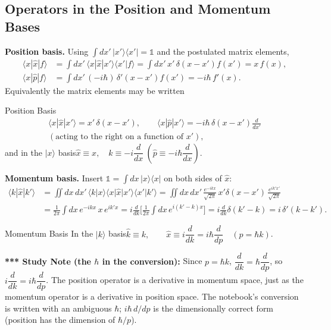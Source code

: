 \documentclass[11pt,a4paper]{article}
\begin{document}
\subsection{Operators in the Position and Momentum Bases}
\textbf{Position basis.} Using $\int dx'\,|x'\rangle\langle x'|=\mathbb 1$ and the postulated matrix elements,
\begin{align*}
\langle x|\hat x|f\rangle&=\int dx'\,\langle x|\hat x|x'\rangle\langle x'|f\rangle=\int dx'\,x'\,\delta(x-x')f(x')=x\,f(x),\\
\langle x|\hat p|f\rangle&=\int dx'\,(-i\hbar)\,\delta'(x-x')f(x')=-i\hbar\,f'(x).
\end{align*}
Equivalently the matrix elements may be written
\begin{thm}{Position Basis}
\begin{gather*}
\langle x|\hat x|x'\rangle=x'\,\delta(x-x'),\qquad
\langle x|\hat p|x'\rangle=-i\hbar\,\delta(x-x')\frac d{dx'}\\
(\text{acting to the right on a function of }x'),
\end{gather*}
and in the $|x\rangle$ basis\quad $\hat x\equiv x,\quad \hat k\equiv-i\dfrac d{dx}\ (\hat p\equiv-i\hbar\dfrac d{dx})$.
\end{thm}

\textbf{Momentum basis.} Insert $\mathbb 1=\int dx\,|x\rangle\langle x|$ on both sides of $\hat x$:
\begin{align*}
\langle k|\hat x|k'\rangle&=\iint dx\,dx'\,\langle k|x\rangle\langle x|\hat x|x'\rangle\langle x'|k'\rangle
=\iint dx\,dx'\,\frac{e^{-ikx}}{\sqrt{2\pi}}\,x'\delta(x-x')\,\frac{e^{ik'x'}}{\sqrt{2\pi}}\\
&=\frac1{2\pi}\int dx\,e^{-ikx}\,x\,e^{ik'x}
=i\frac d{dk}\Big[\frac1{2\pi}\int dx\,e^{i(k'-k)x}\Big]=i\frac d{dk}\delta(k'-k)=i\,\delta'(k-k').
\end{align*}
\begin{thm}{Momentum Basis}
In the $|k\rangle$ basis\quad $\hat k\equiv k,\qquad \hat x\equiv i\dfrac d{dk}=i\hbar\dfrac d{dp}\quad(p=\hbar k)$.
\end{thm}
\textbf{*** Study Note (the $\hbar$ in the conversion):} Since $p=\hbar k$, $\dfrac d{dk}=\hbar\dfrac d{dp}$, so $i\dfrac d{dk}=i\hbar\dfrac d{dp}$. The position operator is a derivative in momentum space, just as the momentum operator is a derivative in position space. The notebook's conversion is written with an ambiguous $\hbar$; $i\hbar\,d/dp$ is the dimensionally correct form (position has the dimension of $\hbar/p$).
\end{document}
